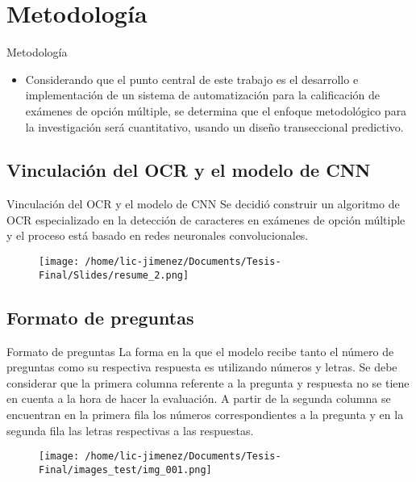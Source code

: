 \documentclass{beamer}
\begin{document}
\section{Metodología}
\begin{frame}{Metodología}
    \begin{itemize}
        \item Considerando que el punto central de este trabajo es el desarrollo e implementación de un sistema de
        automatización para la calificación de exámenes de opción múltiple, se determina que el enfoque
        metodológico para la investigación será cuantitativo, usando un diseño transeccional predictivo.
    \end{itemize}    
\end{frame}


\subsection{Vinculación del OCR y el modelo de CNN}
\begin{frame}{Vinculación del OCR y el modelo de CNN}
    Se decidió construir un algoritmo de OCR especializado en la detección de caracteres en exámenes de opción múltiple y el proceso está basado en redes neuronales convolucionales.

    \begin{figure}
        \centering
        \texttt{[image: /home/lic-jimenez/Documents/Tesis-Final/Slides/resume\_2.png]}
    \end{figure}
\end{frame}



\subsection{Formato de preguntas}
\begin{frame}{Formato de preguntas}
    La forma en la que el modelo recibe tanto el número de preguntas como su respectiva respuesta es utilizando números y letras. Se debe considerar que la primera columna referente a la pregunta y respuesta no se tiene en cuenta a la hora de hacer la evaluación. A partir de la segunda columna se encuentran en la primera fila los números correspondientes a la pregunta y en la segunda fila las letras respectivas a las respuestas.  
    \begin{figure}
        \centering
        \texttt{[image: /home/lic-jimenez/Documents/Tesis-Final/images\_test/img\_001.png]}
    \end{figure}
\end{frame}
\end{document}
